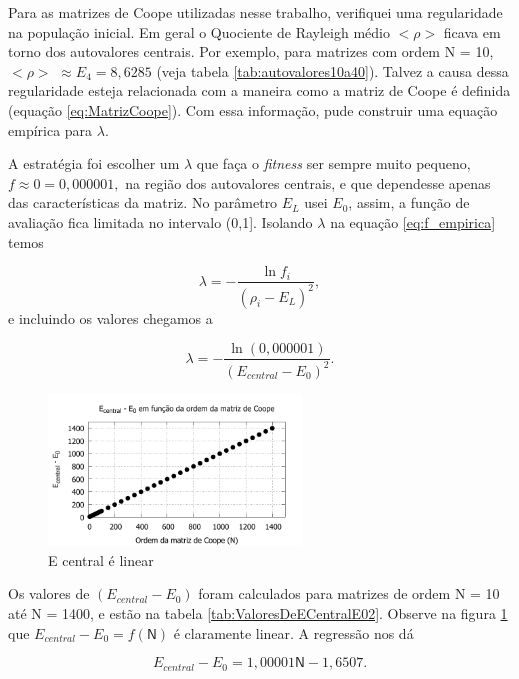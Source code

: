 	Para as matrizes de Coope utilizadas nesse trabalho, verifiquei uma regularidade na população inicial. Em geral o Quociente de Rayleigh médio $<\rho>$ ficava em torno dos autovalores centrais. Por exemplo, para matrizes com ordem N = 10, $<\rho>$ $\approx E_4 = 8,6285$ (veja tabela \ref{tab:autovalores10a40}). Talvez a causa dessa regularidade esteja relacionada com a maneira como a matriz de Coope é definida (equação \ref{eq:MatrizCoope}). Com essa informação, pude construir uma equação empírica para $\lambda$.

	A estratégia foi escolher um $\lambda$ que faça o \emph{fitness} ser sempre muito pequeno, $f \approx 0 = 0,000001,$ na região dos autovalores centrais, e que dependesse apenas das características da matriz. No parâmetro $E_L$ usei $E_0$, assim, a função de avaliação fica limitada no intervalo (0,1]. Isolando $\lambda$ na equação \ref{eq:f_empirica} temos
	
	\begin{equation}
				\lambda = - \frac{\ln f_i}{(\rho_i - E_L)^2},
	\end{equation}
	e incluindo os valores chegamos a
	
	\begin{equation}\label{eq:lambda_E-E0}
				\lambda = - \frac{\ln(0,000001)}{(E_{central} - E_0)^2}.
	\end{equation}
	
	\begin{figure}
		\centering
			\includegraphics[width=0.60\textwidth]{figs/resultados/precisaoFitness/E-central_eE0_funcao_N.pdf}
		\caption{E central é linear}
		\label{fig:E-central_eE0_funcao_N}
	\end{figure}
	
	Os valores de $(E_{central} - E_0)$ foram calculados para matrizes de ordem N = 10 até N = 1400, e estão na tabela \ref{tab:ValoresDeECentralE02}. Observe na figura \ref{fig:E-central_eE0_funcao_N} que $E_{central} - E_0 = f(\mathsf{N})$ é claramente linear. A regressão nos dá
	
	\begin{equation}\label{eq:N_E-E0}
			E_{central} - E_0 = 1,00001\mathsf{N} - 1,6507.
	\end{equation}
	

